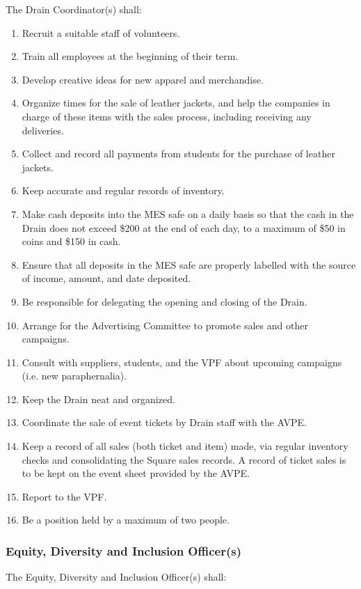 The Drain Coordinator(s) shall:

\begin{enumerate}
 \item
  Recruit a suitable staff of volunteers.
 \item
  Train all employees at the beginning of their term.
 \item
  Develop creative ideas for new apparel and merchandise.
 \item
  Organize times for the sale of leather jackets, and help the companies
  in charge of these items with the sales process, including receiving
  any deliveries.
 \item
  Collect and record all payments from students for the purchase of
  leather jackets.
 \item
  Keep accurate and regular records of inventory.
 \item
  Make cash deposits into the MES safe on a daily basis so that the cash
  in the Drain does not exceed \$200 at the end of each day, to a
  maximum of \$50 in coins and \$150 in cash.
 \item
  Ensure that all deposits in the MES safe are properly labelled with
  the source of income, amount, and date deposited.
 \item
  Be responsible for delegating the opening and closing of the Drain.
 \item
  Arrange for the Advertising Committee to promote sales and other
  campaigns.
 \item
  Consult with suppliers, students, and the VPF about upcoming campaigns
  (i.e. new paraphernalia).
 \item
  Keep the Drain neat and organized.
 \item
  Coordinate the sale of event tickets by Drain staff with the AVPE.
 \item
  Keep a record of all sales (both ticket and item) made, via regular
  inventory checks and consolidating the Square sales records. A record
  of ticket sales is to be kept on the event sheet provided by the AVPE.
 \item
  Report to the VPF.
 \item
  Be a position held by a maximum of two people.
\end{enumerate}

\hypertarget{equity-diversity-and-inclusion-officers}{%
 \subsubsection{Equity, Diversity and Inclusion
  Officer(s)}
 \label{equity-diversity-and-inclusion-officers}}
The Equity, Diversity and Inclusion Officer(s) shall:

